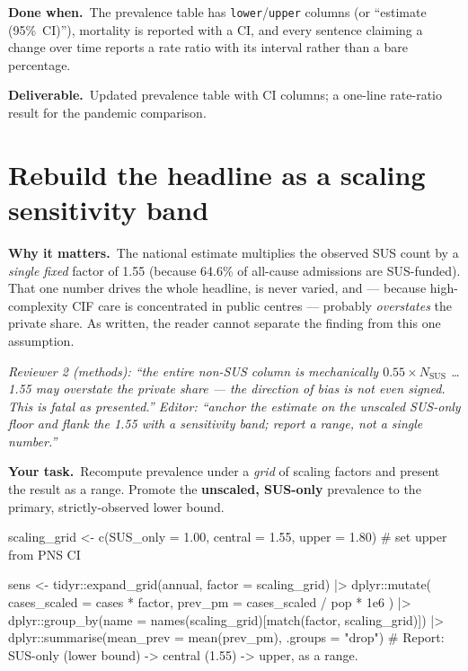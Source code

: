 \documentclass[11pt,a4paper]{article}
\newenvironment{reviewer}%
  {\def\FrameCommand{{\color{rulegray}\vrule width 1.5pt}\hspace{6pt}%
     \colorbox{quotebg}}%
   \MakeFramed{\advance\hsize-\width \FrameRestore}\small\itshape}%
  {\endMakeFramed}
\newcommand{\why}{\textbf{Why it matters.}\ }
\newcommand{\task}{\textbf{Your task.}\ }
\newcommand{\done}{\textbf{Done when.}\ }
\newcommand{\out}{\textbf{Deliverable.}\ }
\begin{document}
\done The prevalence table has \texttt{lower}/\texttt{upper} columns (or ``estimate
(95\%~CI)''), mortality is reported with a CI, and every sentence claiming a change over time
reports a rate ratio with its interval rather than a bare percentage.

\out Updated prevalence table with CI columns; a one-line rate-ratio result for the pandemic
comparison.

\section{Rebuild the headline as a scaling sensitivity band}

\why The national estimate multiplies the observed SUS count by a \emph{single fixed} factor of
1.55 (because 64.6\% of all-cause admissions are SUS-funded). That one number drives the whole
headline, is never varied, and --- because high-complexity CIF care is concentrated in public
centres --- probably \emph{overstates} the private share. As written, the reader cannot separate
the finding from this one assumption.

\begin{reviewer}
Reviewer 2 (methods): ``the entire non-SUS column is mechanically $0.55\times N_{\text{SUS}}$
\ldots 1.55 may overstate the private share --- the direction of bias is not even signed. This
is fatal \emph{as presented}.''
\end{reviewer}
\begin{reviewer}
Editor: ``anchor the estimate on the unscaled SUS-only floor and flank the 1.55 with a
sensitivity band; report a range, not a single number.''
\end{reviewer}

\task Recompute prevalence under a \emph{grid} of scaling factors and present the result as a
range. Promote the \textbf{unscaled, SUS-only} prevalence to the primary, strictly-observed
lower bound.

\begin{Rcode}
scaling_grid <- c(SUS_only = 1.00, central = 1.55, upper = 1.80)  # set upper from PNS CI

sens <- tidyr::expand_grid(annual, factor = scaling_grid) |>
  dplyr::mutate(
    cases_scaled = cases * factor,
    prev_pm      = cases_scaled / pop * 1e6
  ) |>
  dplyr::group_by(name = names(scaling_grid)[match(factor, scaling_grid)]) |>
  dplyr::summarise(mean_prev = mean(prev_pm), .groups = "drop")
# Report: SUS-only (lower bound) -> central (1.55) -> upper, as a range.
\end{Rcode}
\end{document}
